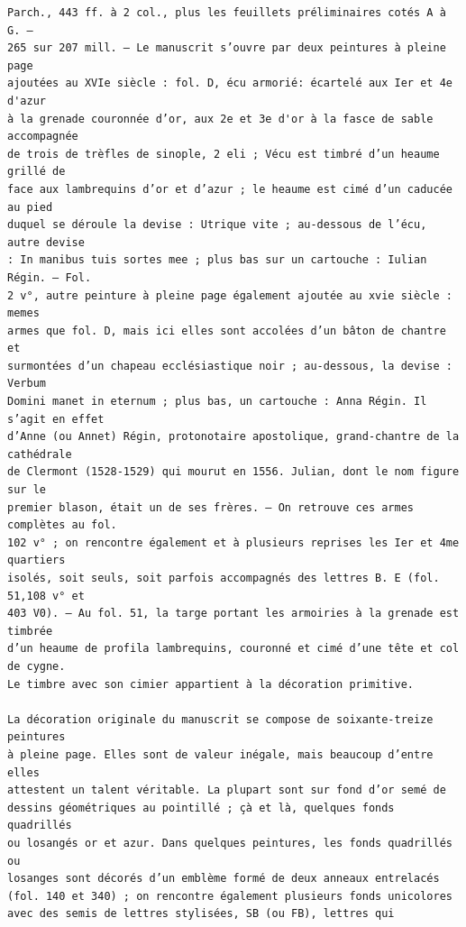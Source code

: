 \documentclass[a4paper,12pt,twoside]{book}
\begin{document}
\begin{verbatim}
Parch., 443 ff. à 2 col., plus les feuillets préliminaires cotés A à G. — 
265 sur 207 mill. — Le manuscrit s’ouvre par deux peintures à pleine page 
ajoutées au XVIe siècle : fol. D, écu armorié: écartelé aux Ier et 4e d'azur 
à la grenade couronnée d’or, aux 2e et 3e d'or à la fasce de sable accompagnée
de trois de trèfles de sinople, 2 eli ; Vécu est timbré d’un heaume grillé de 
face aux lambrequins d’or et d’azur ; le heaume est cimé d’un caducée au pied 
duquel se déroule la devise : Utrique vite ; au-dessous de l’écu, autre devise
: In manibus tuis sortes mee ; plus bas sur un cartouche : Iulian Régin. — Fol. 
2 v°, autre peinture à pleine page également ajoutée au xvie siècle : memes 
armes que fol. D, mais ici elles sont accolées d’un bâton de chantre et 
surmontées d’un chapeau ecclésiastique noir ; au-dessous, la devise : Verbum 
Domini manet in eternum ; plus bas, un cartouche : Anna Régin. Il s’agit en effet
d’Anne (ou Annet) Régin, protonotaire apostolique, grand-chantre de la cathédrale
de Clermont (1528-1529) qui mourut en 1556. Julian, dont le nom figure sur le 
premier blason, était un de ses frères. — On retrouve ces armes complètes au fol.
102 v° ; on rencontre également et à plusieurs reprises les Ier et 4me quartiers 
isolés, soit seuls, soit parfois accompagnés des lettres B. E (fol. 51,108 v° et 
403 V0). — Au fol. 51, la targe portant les armoiries à la grenade est timbrée 
d’un heaume de profila lambrequins, couronné et cimé d’une tête et col de cygne.
Le timbre avec son cimier appartient à la décoration primitive.

La décoration originale du manuscrit se compose de soixante-treize peintures 
à pleine page. Elles sont de valeur inégale, mais beaucoup d’entre elles 
attestent un talent véritable. La plupart sont sur fond d’or semé de 
dessins géométriques au pointillé ; çà et là, quelques fonds quadrillés 
ou losangés or et azur. Dans quelques peintures, les fonds quadrillés ou 
losanges sont décorés d’un emblème formé de deux anneaux entrelacés 
(fol. 140 et 340) ; on rencontre également plusieurs fonds unicolores 
avec des semis de lettres stylisées, SB (ou FB), lettres qui




\end{verbatim}
\end{document}
